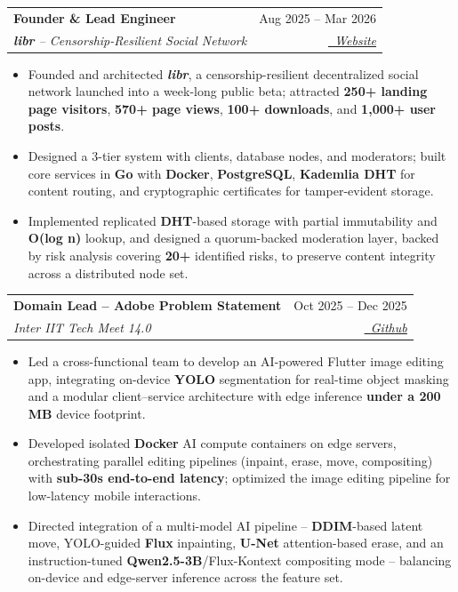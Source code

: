 \documentclass[letterpaper,10pt]{article}
\makeatletter
\newcommand{\resumeItem}[1]{
  \item\small{
    {#1 \vspace{-1mm}}
  }
}
\newcommand{\resumeSubheading}[4]{
  \item
    \begin{tabular*}{0.97\textwidth}[t]{l@{\extracolsep{\fill}}r}
      \textbf{#1} & \small#2 \\
      \textit{\small#3} & \textit{\small #4} \\
    \end{tabular*}\vspace{-7pt}
}
\newcommand{\resumeItemListStart}{\begin{itemize}}
\newcommand{\resumeItemListEnd}{\end{itemize}\vspace{-5pt}}
\makeatother
\begin{document}
    \resumeSubheading
      {Founder \& Lead Engineer}{Aug 2025 -- Mar 2026}
      {\textbf{\textit{libr}} -- Censorship-Resilient Social Network}{\href{https://www.libr.social/}{\faGlobe \ \underline{Website}}}
      \resumeItemListStart
        \resumeItem{Founded and architected \textbf{\textit{libr}}, a censorship-resilient decentralized social network launched into a week-long public beta; attracted \textbf{250+ landing page visitors}, \textbf{570+ page views}, \textbf{100+ downloads}, and \textbf{1,000+ user posts}.}
        \resumeItem{Designed a 3-tier system with clients, database nodes, and moderators; built core services in \textbf{Go} with \textbf{Docker}, \textbf{PostgreSQL}, \textbf{Kademlia DHT} for content routing, and cryptographic certificates for tamper-evident storage.}
        \resumeItem{Implemented replicated \textbf{DHT}-based storage with partial immutability and \textbf{O(log n)} lookup, and designed a quorum-backed moderation layer, backed by risk analysis covering \textbf{20+} identified risks, to preserve content integrity across a distributed node set.}
      \resumeItemListEnd

    \resumeSubheading
      {Domain Lead -- Adobe Problem Statement}{Oct 2025 -- Dec 2025}
      {Inter IIT Tech Meet 14.0}{\href{https://github.com/lakshyajain-0291/adobe-inter-iit}{ \faGithub \ \underline{Github}}}
      \resumeItemListStart
        \resumeItem{Led a cross-functional team to develop an AI-powered Flutter image editing app, integrating on-device \textbf{YOLO} segmentation for real-time object masking and a modular client--service architecture with edge inference \textbf{under a 200 MB} device footprint.}
        \resumeItem{Developed isolated \textbf{Docker} AI compute containers on edge servers, orchestrating parallel editing pipelines (inpaint, erase, move, compositing) with \textbf{sub-30s end-to-end latency}; optimized the image editing pipeline for low-latency mobile interactions.}
        \resumeItem{Directed integration of a multi-model AI pipeline -- \textbf{DDIM}-based latent move, YOLO-guided \textbf{Flux} inpainting, \textbf{U-Net} attention-based erase, and an instruction-tuned \textbf{Qwen2.5-3B}/Flux-Kontext compositing mode -- balancing on-device and edge-server inference across the feature set.}
      \resumeItemListEnd
\end{document}
